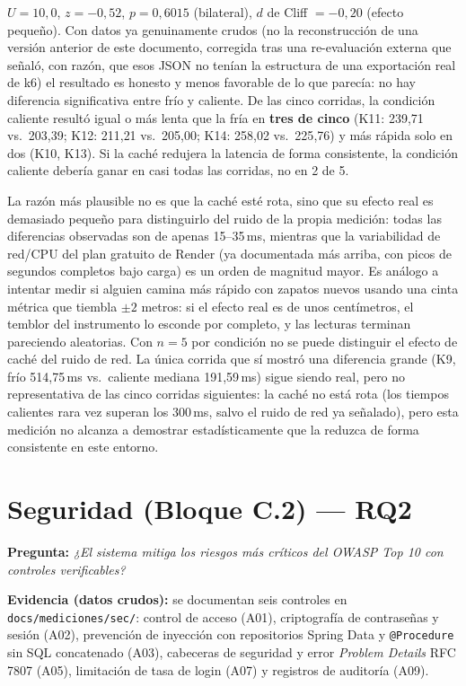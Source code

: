 $U = 10{,}0$, $z = -0{,}52$, $p = 0{,}6015$ (bilateral), $d$ de Cliff $=
-0{,}20$ (efecto pequeño). Con datos ya genuinamente crudos (no la
reconstrucción de una versión anterior de este documento, corregida
tras una re-evaluación externa que señaló, con razón, que esos JSON no
tenían la estructura de una exportación real de k6) el resultado es
honesto y menos favorable de lo que parecía: no hay diferencia
significativa entre frío y caliente. De las cinco corridas, la
condición caliente resultó igual o más lenta que la fría en
\textbf{tres de cinco} (K11: 239{,}71 vs.\ 203{,}39; K12: 211{,}21 vs.\ 205{,}00; K14:
258{,}02 vs.\ 225{,}76) y más rápida solo en dos (K10, K13). Si la caché
redujera la latencia de forma consistente, la condición caliente
debería ganar en casi todas las corridas, no en 2 de 5.

La razón más plausible no es que la caché esté rota, sino que su efecto
real es demasiado pequeño para distinguirlo del ruido de la propia
medición: todas las diferencias observadas son de apenas 15--35\,ms,
mientras que la variabilidad de red/CPU del plan gratuito de Render
(ya documentada más arriba, con picos de segundos completos bajo carga)
es un orden de magnitud mayor. Es análogo a intentar medir si alguien
camina más rápido con zapatos nuevos usando una cinta métrica que tiembla
$\pm 2$ metros: si el efecto real es de unos centímetros, el temblor del
instrumento lo esconde por completo, y las lecturas terminan pareciendo
aleatorias. Con $n=5$ por condición no se puede distinguir el efecto de
caché del ruido de red. La única corrida que sí mostró una diferencia
grande (K9, frío 514{,}75\,ms vs.\ caliente mediana 191{,}59\,ms) sigue
siendo real, pero no representativa de las cinco corridas siguientes:
la caché no está rota (los tiempos calientes rara vez superan los
300\,ms, salvo el ruido de red ya señalado), pero esta medición no
alcanza a demostrar estadísticamente que la reduzca de forma
consistente en este entorno.

\section{Seguridad (Bloque C.2) — RQ2}
\label{sec:sec}

\textbf{Pregunta:} \emph{¿El sistema mitiga los riesgos más críticos del OWASP Top
10 \cite{owasp2021} con controles verificables?}

\textbf{Evidencia (datos crudos):} se documentan seis controles en
\texttt{docs/mediciones/sec/}: control de acceso (A01), criptografía de contraseñas
y sesión (A02), prevención de inyección con repositorios Spring Data y
\texttt{@Procedure} sin SQL concatenado (A03), cabeceras de seguridad y error
\emph{Problem Details} RFC\,7807 \cite{rfc7807} (A05), limitación de tasa de login
(A07) y registros de auditoría (A09).

